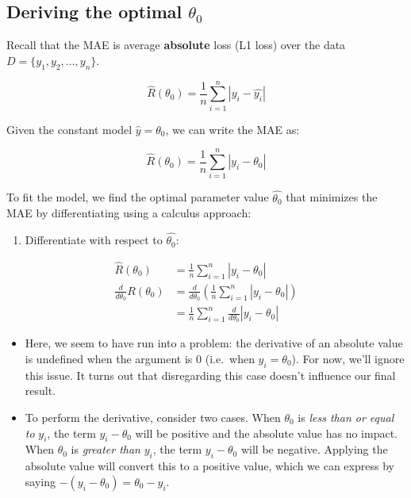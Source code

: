 \documentclass[
  letterpaper,
  DIV=11,
  numbers=noendperiod]{scrreprt}
\providecommand{\tightlist}{%
  \setlength{\itemsep}{0pt}\setlength{\parskip}{0pt}}\usepackage{longtable,booktabs,array}
\begin{document}
\subsection{\texorpdfstring{Deriving the optimal
\(\theta_0\)}{Deriving the optimal \textbackslash theta\_0}}\label{deriving-the-optimal-theta_0-1}

Recall that the MAE is average \textbf{absolute} loss (L1 loss) over the
data \(D = \{y_1, y_2, ..., y_n\}\).

\[\hat{R}(\theta_0) = \frac{1}{n}\sum^{n}_{i=1} |y_i - \hat{y_i}| \]

Given the constant model \(\hat{y} = \theta_0\), we can write the MAE
as:

\[\hat{R}(\theta_0) = \frac{1}{n}\sum^{n}_{i=1} |y_i - \theta_0| \]

To fit the model, we find the optimal parameter value \(\hat{\theta_0}\)
that minimizes the MAE by differentiating using a calculus approach:

\begin{enumerate}
\def\labelenumi{\arabic{enumi}.}
\tightlist
\item
  Differentiate with respect to \(\hat{\theta_0}\):
\end{enumerate}

\begin{align}
\hat{R}(\theta_0) &= \frac{1}{n}\sum^{n}_{i=1} |y_i - \theta_0| \\
\frac{d}{d\theta_0} R(\theta_0) &= \frac{d}{d\theta_0} \left(\frac{1}{n} \sum^{n}_{i=1} |y_i - \theta_0| \right) \\
&= \frac{1}{n} \sum^{n}_{i=1} \frac{d}{d\theta_0} |y_i - \theta_0|
\end{align}

\begin{itemize}
\tightlist
\item
  Here, we seem to have run into a problem: the derivative of an
  absolute value is undefined when the argument is 0 (i.e.~when
  \(y_i = \theta_0\)). For now, we'll ignore this issue. It turns out
  that disregarding this case doesn't influence our final result.
\item
  To perform the derivative, consider two cases. When \(\theta_0\) is
  \emph{less than or equal to} \(y_i\), the term \(y_i - \theta_0\) will
  be positive and the absolute value has no impact. When \(\theta_0\) is
  \emph{greater than} \(y_i\), the term \(y_i - \theta_0\) will be
  negative. Applying the absolute value will convert this to a positive
  value, which we can express by saying
  \(-(y_i - \theta_0) = \theta_0 - y_i\).
\end{itemize}
\end{document}

